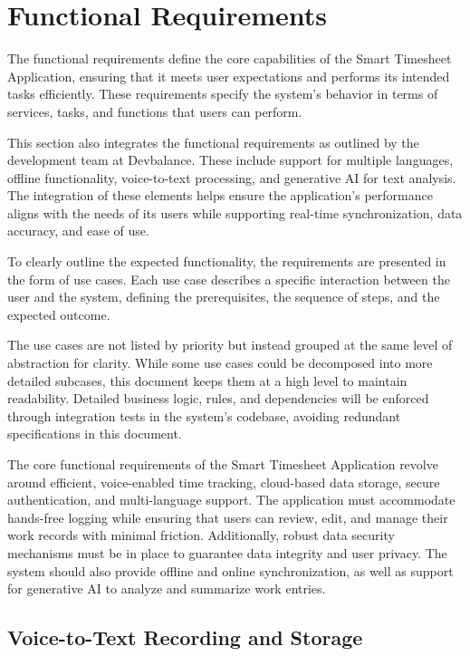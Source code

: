 \documentclass[
  digital,     %
  oneside,     %
  nosansbold,  %
  nocolorbold, %
  lof,         %
  lot,         %
]{fithesis4}
\begin{document}
\section{Functional Requirements}

The functional requirements define the core capabilities of the Smart Timesheet Application, ensuring that it meets user expectations and performs its intended tasks efficiently. These requirements specify the system's behavior in terms of services, tasks, and functions that users can perform.

This section also integrates the functional requirements as outlined by the development team at Devbalance. These include support for multiple languages, offline functionality, voice-to-text processing, and generative AI for text analysis. The integration of these elements helps ensure the application’s performance aligns with the needs of its users while supporting real-time synchronization, data accuracy, and ease of use.

To clearly outline the expected functionality, the requirements are presented in the form of use cases. Each use case describes a specific interaction between the user and the system, defining the prerequisites, the sequence of steps, and the expected outcome.

The use cases are not listed by priority but instead grouped at the same level of abstraction for clarity. While some use cases could be decomposed into more detailed subcases, this document keeps them at a high level to maintain readability. Detailed business logic, rules, and dependencies will be enforced through integration tests in the system’s codebase, avoiding redundant specifications in this document.

The core functional requirements of the Smart Timesheet Application revolve around efficient, voice-enabled time tracking, cloud-based data storage, secure authentication, and multi-language support. The application must accommodate hands-free logging while ensuring that users can review, edit, and manage their work records with minimal friction. Additionally, robust data security mechanisms must be in place to guarantee data integrity and user privacy. The system should also provide offline and online synchronization, as well as support for generative AI to analyze and summarize work entries.

\subsection{Voice-to-Text Recording and Storage}
\end{document}
